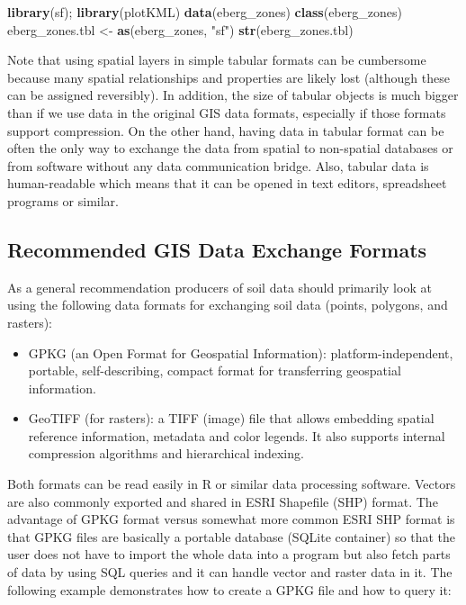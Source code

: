 \documentclass[10pt,b5paper,]{book}
\newenvironment{Shaded}{\begin{snugshade}}{\end{snugshade}}
\newcommand{\KeywordTok}[1]{\textcolor[rgb]{0.13,0.29,0.53}{\textbf{#1}}}
\newcommand{\NormalTok}[1]{#1}
\newcommand{\StringTok}[1]{\textcolor[rgb]{0.31,0.60,0.02}{#1}}
\providecommand{\tightlist}{%
  \setlength{\itemsep}{0pt}\setlength{\parskip}{0pt}}
\theoremstyle{definition}
\theoremstyle{definition}
\theoremstyle{definition}
\theoremstyle{remark}
\begin{document}
\begin{Shaded}
\begin{Highlighting}[]
\KeywordTok{library}\NormalTok{(sf); }\KeywordTok{library}\NormalTok{(plotKML)}
\KeywordTok{data}\NormalTok{(eberg_zones)}
\KeywordTok{class}\NormalTok{(eberg_zones)}
\NormalTok{eberg_zones.tbl <-}\StringTok{ }\KeywordTok{as}\NormalTok{(eberg_zones, }\StringTok{"sf"}\NormalTok{)}
\KeywordTok{str}\NormalTok{(eberg_zones.tbl)}
\end{Highlighting}
\end{Shaded}

Note that using spatial layers in simple tabular formats can be
cumbersome because many spatial relationships and properties are likely
lost (although these can be assigned reversibly). In addition, the size
of tabular objects is much bigger than if we use data in the original
GIS data formats, especially if those formats support compression. On
the other hand, having data in tabular format can be often the only way
to exchange the data from spatial to non-spatial databases or from
software without any data communication bridge. Also, tabular data is
human-readable which means that it can be opened in text editors,
spreadsheet programs or similar.

\hypertarget{recommended-gis-data-exchange-formats}{%
\subsection{Recommended GIS Data Exchange
Formats}\label{recommended-gis-data-exchange-formats}}

As a general recommendation producers of soil data should primarily look
at using the following data formats for exchanging soil data (points,
polygons, and rasters):

\begin{itemize}
\tightlist
\item
  GPKG (an Open Format for Geospatial Information):
  platform-independent, portable, self-describing, compact format for
  transferring geospatial information.
\item
  GeoTIFF (for rasters): a TIFF (image) file that allows embedding
  spatial reference information, metadata and color legends. It also
  supports internal compression algorithms and hierarchical indexing.
\end{itemize}

Both formats can be read easily in R or similar data processing
software. Vectors are also commonly exported and shared in ESRI
Shapefile (SHP) format. The advantage of GPKG format versus somewhat
more common ESRI SHP format is that GPKG files are basically a portable
database (SQLite container) so that the user does not have to import the
whole data into a program but also fetch parts of data by using SQL
queries and it can handle vector and raster data in it. The following
example demonstrates how to create a GPKG file and how to query it:
\end{document}
